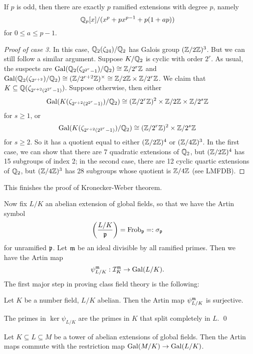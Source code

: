 \documentclass[11pt]{amsart}
\begin{document}
\begin{Rem}
    If $p$ is odd, then there are exactly $p$ ramified extensions with degree $p$, namely
    \[\mathbb{Q}_p[x]/(x^p + px^{p-1} + p(1+ap))\]
    for $0\le a\le p-1$. 
\end{Rem}


\begin{proof}[Proof of case 3]
    In this case, $\mathbb{Q}_2(\zeta_{24})/\mathbb{Q}_2$ has Galois group $(\mathbb{Z}/2\mathbb{Z})^3$. But we can still follow a similar argument. Suppose $K/\mathbb{Q}_2$ is cyclic with order $2^r$. As usual, the suspects are $\operatorname{Gal}(\mathbb{Q}_2(\zeta_{2^{2^r}-1})/\mathbb{Q}_2) \cong \mathbb{Z}/2^r\mathbb{Z}$ and $\operatorname{Gal}(\mathbb{Q}_2(\zeta_{2^{r+2}})/\mathbb{Q}_2) \cong (\mathbb{Z}/2^{r+2}\mathbb{Z})^{\times} \cong \mathbb{Z}/2\mathbb{Z}\times \mathbb{Z}/2^r\mathbb{Z}$. We claim that $K\subseteq \mathbb{Q}(\zeta_{2^{r+2}(2^{2^r}-1)})$. Suppose otherwise, then either
    \[\operatorname{Gal}(K(\zeta_{2^{r+2}(2^{2^r}-1)})/\mathbb{Q}_2) \cong (\mathbb{Z}/2^r\mathbb{Z})^2\times \mathbb{Z}/2\mathbb{Z} \times \mathbb{Z}/2^s\mathbb{Z}\]
    for $s\ge 1$, or
    \[\operatorname{Gal}(K(\zeta_{2^{r+2}(2^{2^r}-1)})/\mathbb{Q}_2) \cong (\mathbb{Z}/2^r\mathbb{Z})^2\times \mathbb{Z}/2^s\mathbb{Z}\]
    for $s\ge 2$. So it has a quotient equal to either $(\mathbb{Z}/2\mathbb{Z})^4$ or $(\mathbb{Z}/4\mathbb{Z})^3$. In the first case, we can show that there are 7 quadratic extensions of $\mathbb{Q}_2$, but $(\mathbb{Z}/2\mathbb{Z})^4$ has 15 subgroups of index 2; in the second case, there are 12 cyclic quartic extensions of $\mathbb{Q}_2$, but $(\mathbb{Z}/4\mathbb{Z})^3$ has 28 subgroups whose quotient is $\mathbb{Z}/4\mathbb{Z}$ (see LMFDB).
\end{proof}

This finishes the proof of Kronecker-Weber theorem.

Now fix $L/K$ an abelian extension of global fields, so that we have the Artin symbol
\[\left( \frac{L/K}{\mathfrak{p}} \right) = \operatorname{Frob}_{\mathfrak{p}} =: \sigma_{\mathfrak{p}}\]
for unramified $\mathfrak{p}$.
Let $\mathfrak{m}$ be an ideal divisible by all ramified primes. Then we have the Artin map
\[\psi_{L/K}^{\mathfrak{m}}: \mathcal{I}_K^{\mathfrak{m}} \to \operatorname{Gal}(L/K).\]
The first major step in proving class field theory is the following:

\begin{prop}
    Let $K$ be a number field, $L/K$ abelian. Then the Artin map $\psi_{L/K}^{\mathfrak{m}}$ is surjective.
\end{prop}

\begin{prop}
    The primes in $\ker\psi_{L/K}$ are the primes in $K$ that split completely in $L$. \qed
\end{prop}

\begin{prop}
    Let $K\subseteq L\subseteq M$ be a tower of abelian extensions of global fields. Then the Artin maps commute with the restriction map $\operatorname{Gal}(M/K)\to \operatorname{Gal}(L/K)$.
\end{prop}
\end{document}
